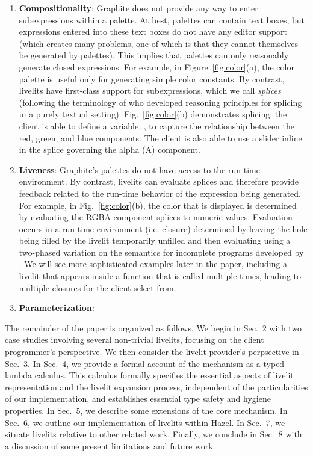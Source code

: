 \begin{enumerate}
  \item \textbf{Compositionality}: 
  Graphite does not provide any way to {enter subexpressions within a palette}.
  At best, palettes can contain text boxes, but expressions entered into these text boxes 
  do not have any editor support (which creates many problems, one of which is that they cannot themselves be generated by palettes). 
  This implies that palettes can only reasonably generate {closed expressions}. 
  For example, in Figure~\ref{fig:color}(a), the color palette
  is useful only for generating simple color constants. 
  By contrast, livelits have first-class support for subexpressions, which we call \emph{splices} (following
  the terminology of \citet{TLMs} who developed reasoning principles for splicing in a purely textual setting).
  Fig.~\ref{fig:color}(b) demonstrates splicing: the client is able to define a variable, , 
  to capture the relationship between the red, green, and blue components.
  The client is also able to use a slider inline in the splice governing 
  the alpha (A) component.
  \item \textbf{Liveness}: Graphite's palettes do not have 
  access to the run-time environment. By contrast, livelits can evaluate splices
  and therefore provide feedback related to the run-time behavior of the expression being generated. 
  For example, in Fig.~\ref{fig:color}(b), the color that is displayed is determined by evaluating the RGBA 
  component splices to numeric values.
  Evaluation occurs in a run-time environment (i.e. closure) determined by 
  leaving the hole being filled by the livelit temporarily unfilled and then evaluating
  using a two-phased variation on the semantics for incomplete programs developed by \citet{HazelnutLive}. 
  We will see more sophisticated examples later in the paper, including a livelit 
  that appears inside a function that is called multiple times, leading to multiple closures for the client 
  select from.
  \item \textbf{Parameterization}: 
\end{enumerate}
\clearpage

The remainder of the paper is organized as follows. We begin in Sec.~2 with two case studies 
involving several non-trivial livelits, focusing on the client programmer's perspective. 
We then consider the livelit provider's perpsective in Sec.~3.
In Sec.~4, we provide a formal account of the mechanism as a typed lambda calculus. 
This calculus formally specifies the essential aspects of livelit representation and 
the livelit expansion process, independent of the particularities of our implementation, 
and establishes essential type safety and hygiene properties. 
In Sec.~5, we describe some extensions of the core mechanism.
In Sec.~6, we outline our implementation of livelits within Hazel.
In Sec.~7, we situate livelits relative to other related work. 
Finally, we conclude in Sec.~8 with a discussion of some present limitations and future work.

